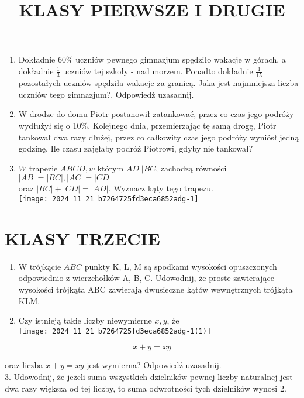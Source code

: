 \documentclass[10pt]{article}
\title{KLASY PIERWSZE I DRUGIE }
\author{}
\date{}
\begin{document}
\maketitle
\begin{enumerate}
  \item Dokładnie \(60 \%\) uczniów pewnego gimnazjum spędziło wakacje w górach, a dokładnie \(\frac{1}{3}\) uczniów tej szkoły - nad morzem. Ponadto dokładnie \(\frac{1}{15}\) pozostałych uczniów spędziła wakacje za granicą. Jaka jest najmniejsza liczba uczniów tego gimnazjum?. Odpowiedź uzasadnij.
  \item W drodze do domu Piotr postanowił zatankować, przez co czas jego podróży wydłużył się o 10\%. Kolejnego dnia, przemierzając tę samą drogę, Piotr tankował dwa razy dłużej, przez co całkowity czas jego podróży wyniósł jedną godzinę. Ile czasu zajęłaby podróż Piotrowi, gdyby nie tankował?
  \item \(W\) trapezie \(A B C D, w\) którym \(A D|\mid B C\), zachodzą równości \(|A B|=|B C|,|A C|=|C D|\)\\
oraz \(|B C|+|C D|=|A D|\). Wyznacz kąty tego trapezu.\\
\texttt{[image: 2024\_11\_21\_b7264725fd3eca6852adg-1]}
\end{enumerate}

\section*{KLASY TRZECIE}
\begin{enumerate}
  \item W trójkącie \(A B C\) punkty K, L, M są spodkami wysokości opuszczonych odpowiednio z wierzchołków A, B, C. Udowodnij, że proste zawierające wysokości trójkąta ABC zawierają dwusieczne kątów wewnętrznych trójkąta KLM.
  \item Czy istnieją takie liczby niewymierne \(x, y\), że\\
\texttt{[image: 2024\_11\_21\_b7264725fd3eca6852adg-1(1)]}
\end{enumerate}

\[
x+y=x y
\]

oraz liczba \(x+y=x y\) jest wymierna? Odpowiedź uzasadnij.\\
3. Udowodnij, że jeżeli suma wszystkich dzielników pewnej liczby naturalnej jest dwa razy większa od tej liczby, to suma odwrotności tych dzielników wynosi 2.
\end{document}
